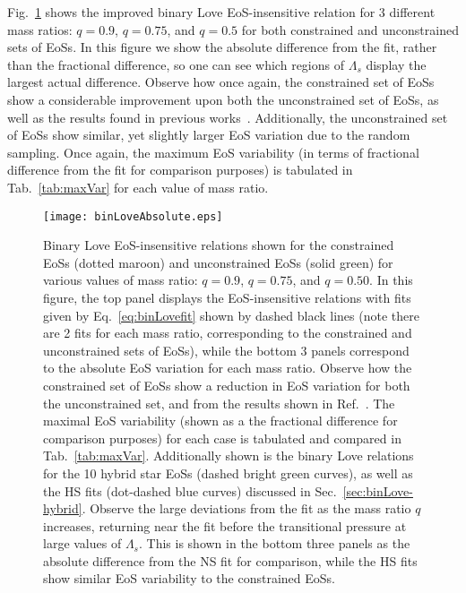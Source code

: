 \documentclass[prd,twocolumn,nofootinbib,superscriptaddress,amsmath,amssymb]{revtex4-1}
\begin{document}
Fig.~\ref{fig:binLove} shows the improved binary Love EoS-insensitive relation for 3 different mass ratios: $q=0.9$, $q=0.75$, and $q=0.5$ for both constrained and unconstrained sets of EoSs.
In this figure we show the absolute difference from the fit, rather than the fractional difference, so one can see which regions of $\Lambda_s$ display the largest actual difference.
Observe how once again, the constrained set of EoSs show a considerable improvement upon both the unconstrained set of EoSs, as well as the results found in previous works~\cite{Yagi:binLove}.
Additionally, the unconstrained set of EoSs show similar, yet slightly larger EoS variation due to the random sampling.
Once again, the maximum EoS variability (in terms of fractional difference from the fit for comparison purposes) is tabulated in Tab.~\ref{tab:maxVar} for each value of mass ratio.

\begin{figure}
\begin{center} 
\texttt{[image: binLoveAbsolute.eps]}%
\end{center}
\caption{
Binary Love EoS-insensitive relations shown for the constrained EoSs (dotted maroon) and unconstrained EoSs (solid green) for various values of mass ratio: $q=0.9$, $q=0.75$, and $q=0.50$.
In this figure, the top panel displays the EoS-insensitive relations with fits given by Eq.~\ref{eq:binLovefit} shown by dashed black lines (note there are 2 fits for each mass ratio, corresponding to the constrained and unconstrained sets of EoSs), while the bottom 3 panels correspond to the absolute EoS variation for each mass ratio.
Observe how the constrained set of EoSs show a reduction in EoS variation for both the unconstrained set, and from the results shown in Ref.~\cite{Yagi:binLove}.
The maximal EoS variability (shown as a the fractional difference for comparison purposes) for each case is tabulated and compared in Tab.~\ref{tab:maxVar}.
Additionally shown is the binary Love relations for the 10 hybrid star EoSs (dashed bright green curves), as well as the HS fits (dot-dashed blue curves) discussed in Sec.~\ref{sec:binLove-hybrid}.
Observe the large deviations from the fit as the mass ratio $q$ increases, returning near the fit before the transitional pressure at large values of $\Lambda_s$.
This is shown in the bottom three panels as the absolute difference from the NS fit for comparison, while the HS fits show similar EoS variability to the constrained EoSs.
}
\label{fig:binLove}
\end{figure} 
\end{document}
